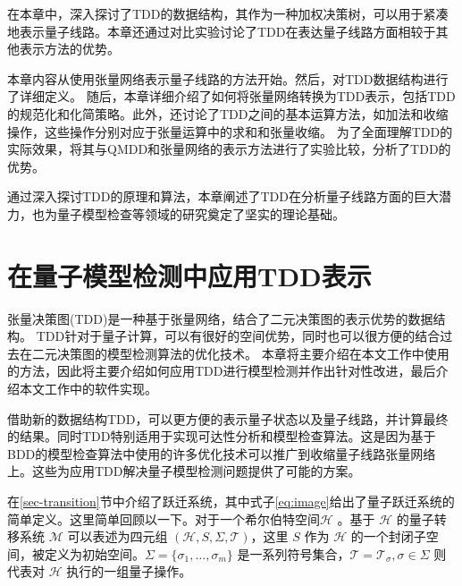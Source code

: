 在本章中，深入探讨了TDD的数据结构，其作为一种加权决策树，可以用于紧凑地表示量子线路。本章还通过对比实验讨论了TDD在表达量子线路方面相较于其他表示方法的优势。

本章内容从使用张量网络表示量子线路的方法开始。然后，对TDD数据结构进行了详细定义。
随后，本章详细介绍了如何将张量网络转换为TDD表示，包括TDD的规范化和化简策略。此外，还讨论了TDD之间的基本运算方法，如加法和收缩操作，这些操作分别对应于张量运算中的求和和张量收缩。
为了全面理解TDD的实际效果，将其与QMDD和张量网络的表示方法进行了实验比较，分析了TDD的优势。

通过深入探讨TDD的原理和算法，本章阐述了TDD在分析量子线路方面的巨大潜力，也为量子模型检查等领域的研究奠定了坚实的理论基础。
\chapter{在量子模型检测中应用TDD表示}
张量决策图(TDD)是一种基于张量网络，结合了二元决策图的表示优势的数据结构。
TDD针对于量子计算，可以有很好的空间优势，同时也可以很方便的结合过去在二元决策图的模型检测算法的优化技术。
本章将主要介绍在本文工作中使用的方法，因此将主要介绍如何应用TDD进行模型检测并作出针对性改进，最后介绍本文工作中的软件实现。

借助新的数据结构TDD，可以更方便的表示量子状态以及量子线路，并计算最终的结果。同时TDD特别适用于实现可达性分析和模型检查算法。这是因为基于BDD的模型检查算法中使用的许多优化技术可以推广到收缩量子线路张量网络上\citep{Chaki_2018}。这些为应用TDD解决量子模型检测问题提供了可能的方案。

在\ref{sec-transition}节中介绍了跃迁系统，其中式子\ref{eq:image}给出了量子跃迁系统的简单定义。这里简单回顾以一下。对于一个希尔伯特空间$\mathcal{H}$ 。基于 $\mathcal{H}$ 的量子转移系统 $\mathcal{M}$ 可以表述为四元组 $(\mathcal{H}, S, \Sigma, \mathcal{T})$，这里 $S$ 作为 $\mathcal{H}$ 的一个封闭子空间，被定义为初始空间。$\Sigma=\{\sigma_1,\ldots,\sigma_m\}$ 是一系列符号集合，$\mathcal{T}=\mathcal{T}_\sigma, {\sigma \in \Sigma}$ 则代表对 $\mathcal{H}$ 执行的一组量子操作。


